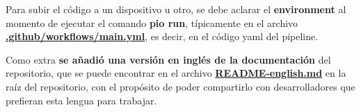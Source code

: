 Para subir el código a un dispositivo u otro, se debe aclarar el \textbf{environment} al momento de ejecutar el comando \textbf{pio run}, típicamente en el archivo \href{https://github.com/FeedehC/pipeline-esp32/blob/main/.github/workflows/main.yml}{\textbf{.github/workflows/main.yml}}, es decir, en el código yaml del pipeline.

Como extra \textbf{se añadió una versión en inglés de la documentación} del repositorio, que se puede encontrar en el archivo \href{https://github.com/FeedehC/pipeline-esp32/blob/main/README-english.md}{\textbf{README-english.md}} en la raíz del repositorio, con el propósito de poder compartirlo con desarrolladores que prefieran esta lengua para trabajar.

